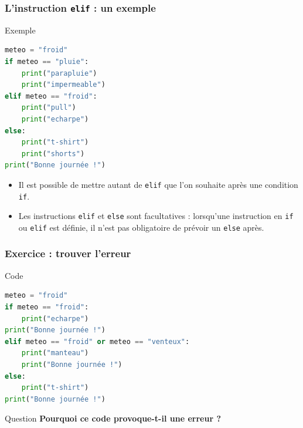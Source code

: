 \documentclass[10pt]{beamer}
\begin{document}
\begin{frame}[containsverbatim]
	\frametitle{L'instruction \texttt{elif} : un exemple}
	
	
\begin{exampleblock}{Exemple}
\begin{lstlisting}[language=Python]
meteo = "froid"
if meteo == "pluie":
	print("parapluie")
	print("impermeable")
elif meteo == "froid":
	print("pull")
	print("echarpe")
else:
	print("t-shirt")
	print("shorts")
print("Bonne journée !")
\end{lstlisting}
\end{exampleblock}
	
\begin{itemize}
	\item Il est possible de mettre autant de \texttt{elif} que l'on souhaite après une condition \texttt{if}.
	\item  Les instructions \texttt{elif} et \texttt{else} sont facultatives : lorsqu'une instruction en \texttt{if} ou \texttt{elif} est définie, il n'est pas obligatoire de prévoir un \texttt{else} après.
\end{itemize}
	
	
\end{frame}

\begin{frame}[containsverbatim]
	\frametitle{Exercice : trouver l'erreur}
	
	
	\vspace{0.2cm}
	
	\begin{exampleblock}{Code}
		\begin{lstlisting}[language=Python]
meteo = "froid"
if meteo == "froid":
	print("echarpe")
print("Bonne journée !")
elif meteo == "froid" or meteo == "venteux":
	print("manteau")
	print("Bonne journée !")
else:
	print("t-shirt")
print("Bonne journée !")
		\end{lstlisting}
	\end{exampleblock}
	
	
	\begin{alertblock}{Question}
		\centering
		\textbf{Pourquoi ce code provoque-t-il une erreur ?}
	\end{alertblock}
	
	
\end{frame}
\end{document}
